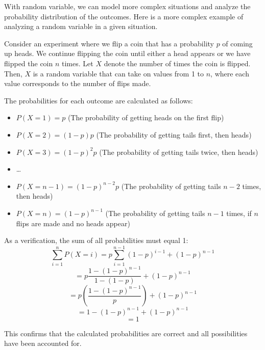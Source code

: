 With random variable, we can model more complex situations and analyze the probability distribution of the outcomes.
Here is a more complex example of analyzing a random variable in a given situation.
\begin{example}
    Consider an experiment where we flip a coin that has a probability \( p \) of 
coming up heads. We continue flipping the coin until either a head appears or 
we have flipped the coin \( n \) times. Let \( X \) denote the number of times 
the coin is flipped. Then, \( X \) is a random variable that can take on values 
from 1 to \( n \), where each value corresponds to the number of flips made.

The probabilities for each outcome are calculated as follows:
\begin{itemize}
    \item \( P(X = 1) = p \) (The probability of getting heads on the first flip)
    \item \( P(X = 2) = (1 - p) p \) (The probability of getting tails first, then heads)
    \item \( P(X = 3) = (1 - p)^2 p \) (The probability of getting tails twice, then heads)
    \item \dots
    \item \( P(X = n - 1) = (1 - p)^{n-2} p \) (The probability of getting tails \( n-2 \) times, then heads)
    \item \( P(X = n) = (1 - p)^{n-1} \) (The probability of getting tails \( n-1 \) times, if \( n \) flips are made and no heads appear)
\end{itemize}

As a verification, the sum of all probabilities must equal 1:
\[
\sum_{i=1}^{n} P(X = i) = p \sum_{i=1}^{n-1} (1 - p)^{i-1} + (1 - p)^{n-1}
\]
\[
= p \frac{1 - (1 - p)^{n-1}}{1 - (1 - p)} + (1 - p)^{n-1}
\]
\[
= p \left(\frac{1 - (1 - p)^{n-1}}{p}\right) + (1 - p)^{n-1}
\]
\[
= 1 - (1 - p)^{n-1} + (1 - p)^{n-1}
\]
\[
= 1
\]

This confirms that the calculated probabilities are correct and all possibilities 
have been accounted for.
\end{example}

